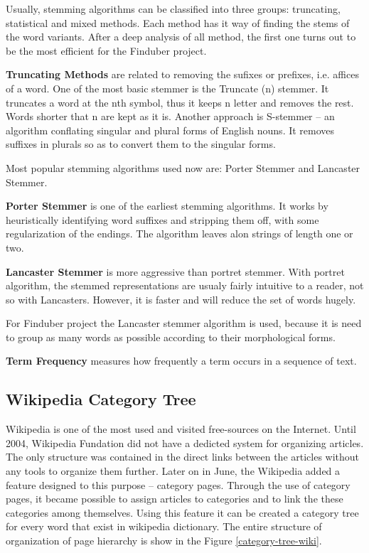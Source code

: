 Usually, stemming algorithms can be classified into three groups: truncating, statistical and mixed methods. Each method has it way of finding the stems of the word variants. After a deep analysis of all method, the first one turns out to be the most efficient for the Finduber project. 

\textbf{Truncating Methods} are related to removing the sufixes or prefixes, i.e. affices of a word. One of the most basic stemmer is the Truncate (n) stemmer. It truncates a word at the nth symbol, thus it keeps n letter and removes the rest. Words shorter that n are kept as it is. Another approach is S-stemmer -- an algorithm conflating singular and plural forms of English nouns. It removes suffixes in plurals so as to convert them to the singular forms. \cite{truncat-stemm}

Most popular stemming algorithms used now are: Porter Stemmer and Lancaster Stemmer.

\textbf{Porter Stemmer} is one of the earliest stemming algorithms. It works by heuristically identifying word suffixes and stripping them off, with some regularization of the endings. The algorithm leaves alon strings of length one or two. 

\textbf{Lancaster Stemmer} is more aggressive than portret stemmer. With portret algorithm, the stemmed representations are usualy fairly intuitive to a reader, not so with Lancasters. However, it is faster and will reduce the set of words hugely. 

For Finduber project the Lancaster stemmer algorithm is used, because it is need to group as many words as possible according to their morphological forms.

\textbf{Term Frequency} measures how frequently a term occurs in a sequence of text.

\subsection{Wikipedia Category Tree}

Wikipedia is one of the most used and visited free-sources on the Internet. Until 2004, Wikipedia Fundation did not have a dedicted system for organizing articles. The only structure was contained in the direct links between the articles without any tools to organize them further.\cite{wikicategory} Later on in June, the Wikipedia added a feature designed to this purpose -- category pages. Through the use of category pages, it became possible to assign articles to categories and to link the these categories among themselves. Using this feature it can be created a category tree for every word that exist in wikipedia dictionary. The entire structure of organization of page hierarchy is show in the Figure \ref{category-tree-wiki}. 

